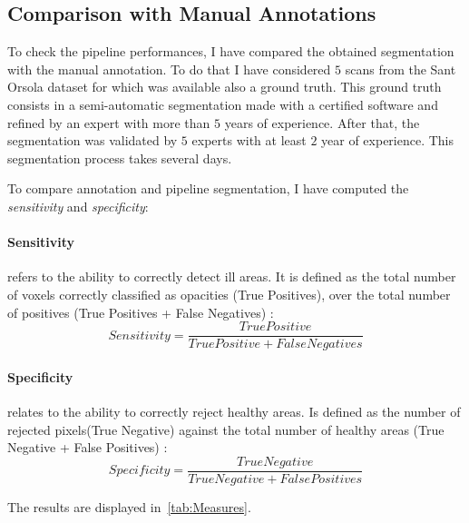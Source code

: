 \documentclass{standalone}
\begin{document}
	\subsection{Comparison with Manual Annotations}
	

	To check the pipeline performances, I have compared the obtained segmentation with the manual annotation. To do that I have considered $5$ scans from the Sant Orsola dataset for which was available also a ground truth. This ground truth consists in a semi-automatic segmentation made with a certified software and refined by an expert with more than $5$ years of experience. After that, the segmentation was validated by $5$ experts with at least $2$ year of experience. This segmentation process takes several days. 

	To compare annotation and pipeline segmentation, I have computed the \emph{sensitivity} and \emph{specificity}: 
	
	\paragraph{Sensitivity} refers to the ability to correctly detect ill areas. It is defined as the total number of voxels correctly classified as opacities (True Positives), over the total number of positives (True Positives + False Negatives) : 
	\begin{equation}\label{eq:sensitivity}
		Sensitivity = \frac{True Positive}{True Positive + False Negatives}
	\end{equation}

	\paragraph{Specificity} relates to the ability to correctly reject healthy areas. Is defined as the number of rejected pixels(True Negative) against the total number of healthy areas (True Negative + False Positives) : 
	\begin{equation}
		Specificity = \frac{True Negative}{True Negative + False Positives}
	\end{equation}


	The results are displayed in \tablename\,\ref{tab:Measures}.
		
\end{document}
